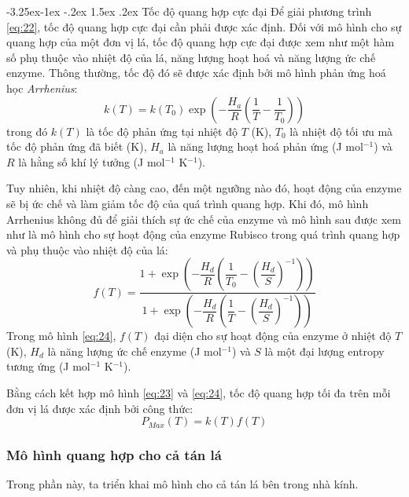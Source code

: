 \documentclass[a4paper]{article}
\makeatletter
\newcounter {subsubsubsection}[subsubsection]
\newcommand\subsubsubsection{\@startsection{subsubsubsection}{4}{\z@}%
                                     {-3.25ex\@plus -1ex \@minus -.2ex}%
                                     {1.5ex \@plus .2ex}%
                                     {\normalfont\normalsize\bfseries}}
\makeatother
\begin{document}
\subsubsubsection{Tốc độ quang hợp cực đại}
Để giải phương trình \eqref{eq:22}, tốc độ quang hợp cực đại cần phải được xác định. Đối với mô hình cho sự quang hợp của một đơn vị lá, tốc độ quang hợp cực đại được xem như một hàm số phụ thuộc vào nhiệt độ của lá, năng lượng hoạt hoá và năng lượng ức chế enzyme. Thông thường, tốc độ đó sẽ được xác định bởi mô hình phản ứng hoá học \emph{Arrhenius}:
\begin{equation}\label{eq:23}
    k(T) = k(T_0)\exp{\left(-\frac{H_a}{R}\left(\frac{1}{T} - \frac{1}{T_0}\right)\right)}
\end{equation}
trong đó $k(T)$ là tốc độ phản ứng tại nhiệt độ $T$ (K), $T_0$ là nhiệt độ tối ưu mà tốc độ phản ứng đã biết (K), $H_a$ là năng lượng hoạt hoá phản ứng (J mol$^{-1}$) và $R$ là hằng số khí lý tưởng (J mol$^{-1}$ K$^{-1}$).
\par
Tuy nhiên, khi nhiệt độ càng cao, đến một ngưỡng nào đó, hoạt động của enzyme sẽ bị ức chế và làm giảm tốc độ của quá trình quang hợp. Khi đó, mô hình Arrhenius không đủ để giải thích sự ức chế của enzyme và mô hình sau được xem như là mô hình cho sự hoạt động của enzyme Rubisco trong quá trình quang hợp và phụ thuộc vào nhiệt độ của lá:
\begin{equation}\label{eq:24}
    f(T) = \frac{1 + \exp{\left( -\dfrac{H_d}{R} \left( \dfrac{1}{T_0} - \left(\dfrac{H_d}{S}\right)^{-1} \right) \right)}}{1 + \exp{\left( -\dfrac{H_d}{R} \left( \dfrac{1}{T} - \left(\dfrac{H_d}{S}\right)^{-1} \right) \right)}}
\end{equation}
Trong mô hình \eqref{eq:24}, $f(T)$ đại diện cho sự hoạt động của enzyme ở nhiệt độ $T$ (K), $H_d$ là năng lượng ức chế enzyme (J mol$^{-1}$) và $S$ là một đại lượng entropy tương ứng (J mol$^{-1}$ K$^{-1}$).
\par
Bằng cách kết hợp mô hình \eqref{eq:23} và \eqref{eq:24}, tốc độ quang hợp tối đa trên mỗi đơn vị lá được xác định bởi công thức:
\begin{equation}\label{eq:25}
    P_{Max}(T) = k(T)f(T)
\end{equation}


\subsubsection{Mô hình quang hợp cho cả tán lá}
Trong phần này, ta triển khai mô hình cho cả tán lá bên trong nhà kính.
\end{document}
